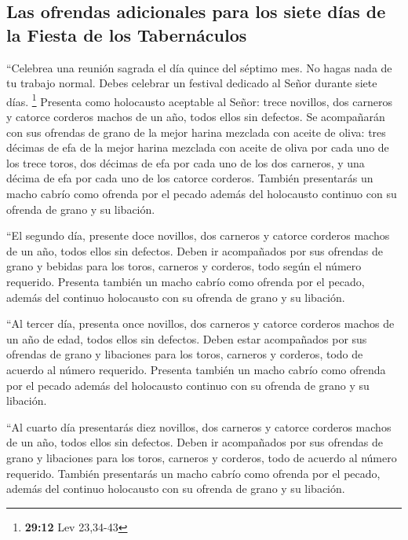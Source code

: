 \hypertarget{las-ofrendas-adicionales-para-los-siete-duxedas-de-la-fiesta-de-los-tabernuxe1culos}{%
\subsection{Las ofrendas adicionales para los siete días de la Fiesta de
los
Tabernáculos}\label{las-ofrendas-adicionales-para-los-siete-duxedas-de-la-fiesta-de-los-tabernuxe1culos}}

 ``Celebrea una reunión sagrada el día quince del séptimo
mes. No hagas nada de tu trabajo normal. Debes celebrar un festival
dedicado al Señor durante siete días. \footnote{\textbf{29:12} Lev
  23,34-43}  Presenta como holocausto aceptable al Señor:
trece novillos, dos carneros y catorce corderos machos de un año, todos
ellos sin defectos.  Se acompañarán con sus ofrendas de
grano de la mejor harina mezclada con aceite de oliva: tres décimas de
efa de la mejor harina mezclada con aceite de oliva por cada uno de los
trece toros, dos décimas de efa por cada uno de los dos carneros,
 y una décima de efa por cada uno de los catorce
corderos.  También presentarás un macho cabrío como
ofrenda por el pecado además del holocausto continuo con su ofrenda de
grano y su libación.

 ``El segundo día, presente doce novillos, dos carneros y
catorce corderos machos de un año, todos ellos sin defectos.
 Deben ir acompañados por sus ofrendas de grano y bebidas
para los toros, carneros y corderos, todo según el número requerido.
 Presenta también un macho cabrío como ofrenda por el
pecado, además del continuo holocausto con su ofrenda de grano y su
libación.

 ``Al tercer día, presenta once novillos, dos carneros y
catorce corderos machos de un año de edad, todos ellos sin defectos.
 Deben estar acompañados por sus ofrendas de grano y
libaciones para los toros, carneros y corderos, todo de acuerdo al
número requerido.  Presenta también un macho cabrío como
ofrenda por el pecado además del holocausto continuo con su ofrenda de
grano y su libación.

 ``Al cuarto día presentarás diez novillos, dos carneros
y catorce corderos machos de un año, todos ellos sin defectos.
 Deben ir acompañados por sus ofrendas de grano y
libaciones para los toros, carneros y corderos, todo de acuerdo al
número requerido.  También presentarás un macho cabrío
como ofrenda por el pecado, además del continuo holocausto con su
ofrenda de grano y su libación.

